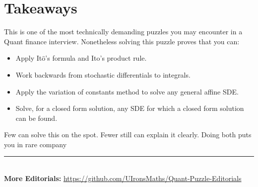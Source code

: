 \documentclass[12pt]{article}
\newcommand{\Itos}{It$\hat{\text{o}}$'s }
\begin{document}
\bigskip

\section*{Takeaways}
This is one of the most technically demanding puzzles you may encounter in a Quant finance interview. Nonetheless solving this puzzle proves that you can:

\begin{itemize}
    \item Apply \Itos formula and \Itos product rule.
    \item Work backwards from stochastic differentials to integrals.
    \item Apply the variation of constants method to solve any general affine SDE.
    \item Solve, for a closed form solution, any SDE for which a closed form solution can be found.
\end{itemize}

Few can solve this on the spot. Fewer still can explain it clearly. Doing both puts you in rare company

\vspace*{\fill}
\begin{center}
    \rule{\linewidth}{0.5pt} \\
    \textbf{More Editorials:} \href{https://github.com/UIronsMaths/Quant-Puzzle-Editorials}{https://github.com/UIronsMaths/Quant-Puzzle-Editorials}
\end{center}
\end{document}
